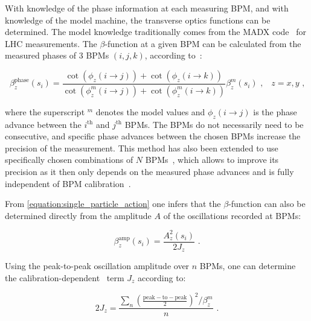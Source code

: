 With knowledge of the phase information at each measuring \gls{BPM}, and with knowledge of the model machine, the transverse optics functions can be determined.
The model knowledge traditionally comes from the \gls{MADX} code~\cite{CODE:MADX_guide} for LHC measurements.
The \(\beta\)-function at a given BPM can be calculated from the measured phases of \num{3} BPMs \((i, j, k)\), according to~\cite{PHD:Castro,BOOK:Minty:Measurements_Control_Charged_Particle_Beams}:

\begin{equation}
  \beta_z^{\mathrm{phase}}(s_i) = \frac{\cot \left(\phi_z(i \rightarrow j)\right) + \cot \left(\phi_z(i \rightarrow k)\right)}{\cot \left(\phi^m_z(i \rightarrow j)\right) + \cot \left(\phi^m_z(i \rightarrow k)\right)} \beta^m_z(s_i)  \text{ ,} \quad z = x, y \text{ ,}
  \label{equation:beta_from_phase}
\end{equation}
\vspace{0.3mm}

\noindent
where the superscript \(^m\) denotes the model values and \(\phi_z(i \rightarrow j)\) is the phase advance between the \(i^{\mathrm{th}}\) and \(j^{\mathrm{th}}\) BPMs.
The BPMs do not necessarily need to be consecutive, and specific phase advances between the chosen BPMs increase the precision of the measurement.
This method has also been extended to use specifically chosen combinations of \(N\) BPMs~\cite{PRAB:Langner:N_BPM_Method,PRAB:Wegscheider:Analytical_N_BPM_Method}, which allows to improve its precision as it then only depends on the measured phase advances and is fully independent of BPM calibration~\cite{PRAB:Langner:Optics_Measurement_Algorithms_Error_Analysis_Proton_Energy_Frontier}.

From \cref{equation:single_particle_action} one infers that the \(\beta\)-function can also be determined directly from the amplitude \(A\) of the oscillations recorded at BPMs:

\begin{equation}
  \beta_z^{\mathrm{amp}}(s_i) = \frac{A_z^2(s_i)}{2 J_z} \text{ .}
  \label{equation:beta_from_amplitude}
\end{equation}

Using the peak-to-peak oscillation amplitude over \(n\) BPMs, one can determine the calibration-dependent~\cite{PRAB:GarciaTabares:BPM_Calibration} term \(J_z\) according to:

\begin{equation}
  2 J_z = \frac{\sum_n \left(\frac{\mathrm{peak-to-peak}}{2}\right)^2 / \beta^m_z}{n} \text{ .}
  \label{equation:J_from_peak_to_peak}
\end{equation}

